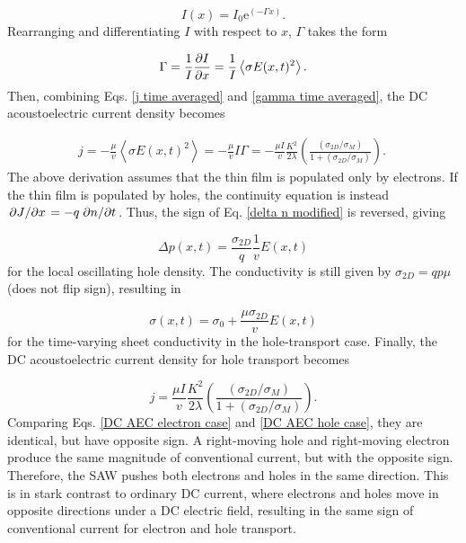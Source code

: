 \documentclass[double,12pt,1in]{beavtex}
\begin{document}
\begin{equation}
    I(x) = I_0 \mathrm{e}^{(-\Gamma x)}.
\end{equation}
Rearranging and differentiating $I$ with respect to $x$, $\Gamma$ takes the form

\begin{equation}
    \Gamma = \frac{1}{I} \pdv{I}{x} = \frac{1}{I}\left\langle\sigma E(x,t)^2\right\rangle. \label{gamma time averaged}
\end{equation}
Then, combining Eqs. \ref{j time averaged} and \ref{gamma time averaged}, the DC acoustoelectric current density becomes

\begin{equation}
    \begin{split}
        j = - \frac{\mu}{v}\left\langle\sigma E(x,t)^2\right\rangle = - \frac{\mu}{v} I\Gamma = - \frac{\mu I}{v} \frac{K^2}{2\lambda}(\frac{(\sigma_{2D}/\sigma_M)}{1+(\sigma_{2D}/\sigma_M)}). \
    \end{split}
    \label{DC AEC electron case}
\end{equation}
The above derivation assumes that the thin film is populated only by electrons. If the thin film is populated by holes, the continuity equation is instead $\pdv*{J}{x} = -q \pdv*{n}{t}$. Thus, the sign of Eq. \ref{delta n modified} is reversed, giving

\begin{equation}
    \Delta p(x,t) = \frac{\sigma_{2D}}{q} \frac{1}{v}E(x,t)
\end{equation}
for the local oscillating hole density. The conductivity is still given by $\sigma_{2D} = q p \mu$ (does not flip sign), resulting in

\begin{equation}
    \sigma(x,t)= \sigma_0 + \frac{\mu \sigma_{2D}}{v}E(x,t)
\end{equation}
for the time-varying sheet conductivity in the hole-transport case. Finally, the DC acoustoelectric current density for hole transport becomes

\begin{equation}
    j = \frac{\mu I}{v} \frac{K^2}{2\lambda}(\frac{(\sigma_{2D}/\sigma_M)}{1+(\sigma_{2D}/\sigma_M)}). \label{DC AEC hole case}
\end{equation}
Comparing Eqs. \ref{DC AEC electron case} and \ref{DC AEC hole case}, they are identical, but have opposite sign. A right-moving hole and right-moving electron produce the same magnitude of conventional current, but with the opposite sign. Therefore, the SAW pushes both electrons and holes in the same direction. This is in stark contrast to ordinary DC current, where electrons and holes move in opposite directions under a DC electric field, resulting in the same sign of conventional current for electron and hole transport.
\end{document}
